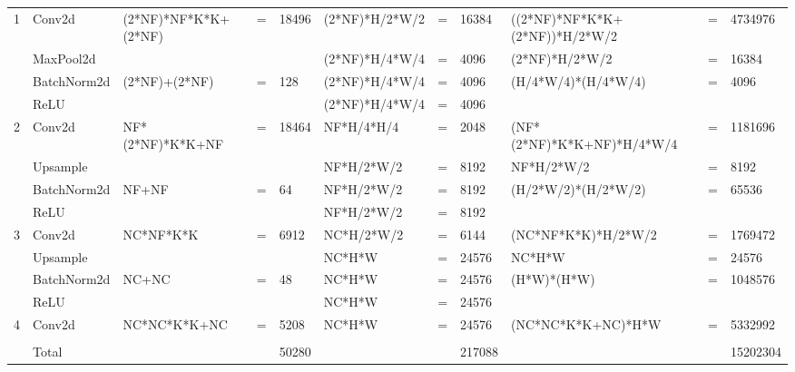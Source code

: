 \documentclass{article}
\begin{document}
\begin{tiny}
\begin{tabular}{@{}lllllllllll@{}}
1     & Conv2d                      & (2*NF)*NF*K*K+(2*NF) & =  & 18496 & (2*NF)*H/2*W/2 & = & 16384  & ((2*NF)*NF*K*K+(2*NF))*H/2*W/2 & = & 4734976  \\
      & MaxPool2d                   &                      &    &       & (2*NF)*H/4*W/4 & = & 4096   & (2*NF)*H/2*W/2                 & = & 16384    \\
      & BatchNorm2d                 & (2*NF)+(2*NF)        & =  & 128   & (2*NF)*H/4*W/4 & = & 4096   & (H/4*W/4)*(H/4*W/4)            & = & 4096     \\
      & ReLU                        &                      &    &       & (2*NF)*H/4*W/4 & = & 4096   &                                &   &          \\
2     & Conv2d                      & NF*(2*NF)*K*K+NF     & =  & 18464 & NF*H/4*H/4     & = & 2048   & (NF*(2*NF)*K*K+NF)*H/4*W/4     & = & 1181696  \\
      & Upsample                    &                      &    &       & NF*H/2*W/2     & = & 8192   & NF*H/2*W/2                     & = & 8192     \\
      & BatchNorm2d                 & NF+NF                & =  & 64    & NF*H/2*W/2     & = & 8192   & (H/2*W/2)*(H/2*W/2)            & = & 65536    \\
      & ReLU                        &                      &    &       & NF*H/2*W/2     & = & 8192   &                                &   &          \\
3     & Conv2d                      & NC*NF*K*K            & =  & 6912  & NC*H/2*W/2     & = & 6144   & (NC*NF*K*K)*H/2*W/2            & = & 1769472  \\
      & Upsample                    &                      &    &       & NC*H*W         & = & 24576  & NC*H*W                         & = & 24576    \\
      & BatchNorm2d                 & NC+NC                & =  & 48    & NC*H*W         & = & 24576  & (H*W)*(H*W)                    & = & 1048576  \\
      & ReLU                        &                      &    &       & NC*H*W         & = & 24576  &                                &   &          \\
4     & Conv2d                      & NC*NC*K*K+NC         & =  & 5208  & NC*H*W         & = & 24576  & (NC*NC*K*K+NC)*H*W             & = & 5332992  \\
      &                             &                      &    &       &                &   &        &                                &   &          \\ \midrule
      & Total                       &                      &    & 50280 &                &   & 217088 &                                &   & 15202304 \\ \bottomrule
\end{tabular}
\end{tiny}
\end{document}
